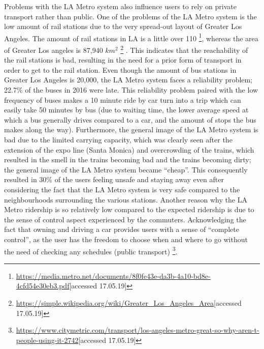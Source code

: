 Problems with the LA Metro system also influence users to rely on private transport rather than public. One of the problems of the LA Metro system is the low amount of rail stations due to the very spread-out layout of Greater Los Angeles. The amount of rail stations in LA is a little over 110 \footnote{\url{https://media.metro.net/documents/8f0fe43e-da3b-4a10-bd8e-4cfd54e30eb3.pdf}[accessed 17.05.19]}, whereas the area of Greater Los angeles is 87,940 $km^{2}$ \footnote{\url{https://simple.wikipedia.org/wiki/Greater_Los_Angeles_Area}[accessed 17.05.19]} . This indicates that the reachability of the rail stations is bad, resulting in the need for a prior form of transport in order to get to the rail station. Even though the amount of bus stations in Greater Los Angeles is 20,000, the LA Metro system faces a reliability problem; 22.7\% of the buses in 2016 were late. This reliability problem paired with the low frequency of buses makes a 10 minute ride by car turn into a trip which can easily take 50 minutes by bus (due to waiting time, the lower average speed at which a bus generally drives compared to a car, and the amount of stops the bus makes along the way). Furthermore, the general image of the LA Metro system is bad due to the limited carrying capacity, which was clearly seen after the extension of the expo line (Santa Monica) and overcrowding of the trains, which resulted in the smell in the trains becoming bad and the trains becoming dirty; the general image of the LA Metro system became “cheap”. This consequently resulted in 30\% of the users feeling unsafe and staying away even after considering the fact that the LA Metro system is very safe compared to the neighbourhoods surrounding the various stations. Another reason why the LA Metro ridership is so relatively low compared to the expected ridership is due to the sense of control aspect experienced by the commuters. Acknowledging the fact that owning and driving a car provides users with a sense of “complete control”, as the user has the freedom to choose when and where to go without the need of checking any schedules (public transport) \footnote{\url{https://www.citymetric.com/transport/los-angeles-metro-great-so-why-aren-t-people-using-it-2742}[accessed 17.05.19]}. 


